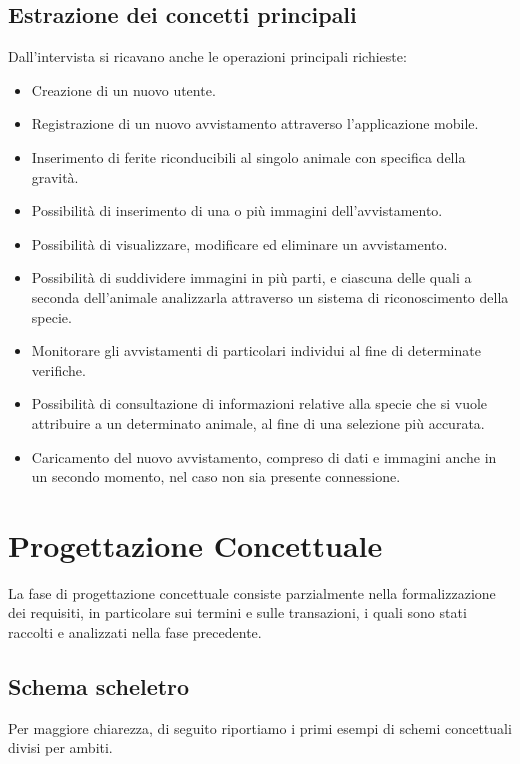 \documentclass[a4paper,final,12pt]{report}
\begin{document}
\subsection{Estrazione dei concetti principali}
Dall'intervista si ricavano anche le operazioni principali richieste:
\begin{itemize}
\item Creazione di un nuovo utente.
\item Registrazione di un nuovo avvistamento attraverso l'applicazione mobile.
\item Inserimento di ferite riconducibili al singolo animale con specifica della gravità.
\item Possibilità di inserimento di una o più immagini dell'avvistamento.
\item Possibilità di visualizzare, modificare ed eliminare un avvistamento.
\item Possibilità di suddividere immagini in più parti, e ciascuna delle quali a seconda dell'animale analizzarla attraverso un sistema di riconoscimento della specie.
\item Monitorare gli avvistamenti di particolari individui al fine di determinate verifiche.
\item Possibilità di consultazione di informazioni relative alla specie che si vuole attribuire a un determinato animale, al fine di una selezione più accurata.
\item Caricamento del nuovo avvistamento, compreso di dati e immagini anche in un secondo momento, nel caso non sia presente connessione.
\end{itemize}

\section{Progettazione Concettuale}
La fase di progettazione concettuale consiste parzialmente nella formalizzazione dei requisiti, in particolare sui termini e sulle transazioni, i quali sono stati raccolti e analizzati nella fase precedente.

\subsection{Schema scheletro}
Per maggiore chiarezza, di seguito riportiamo i primi esempi di schemi concettuali divisi per ambiti.
\end{document}
